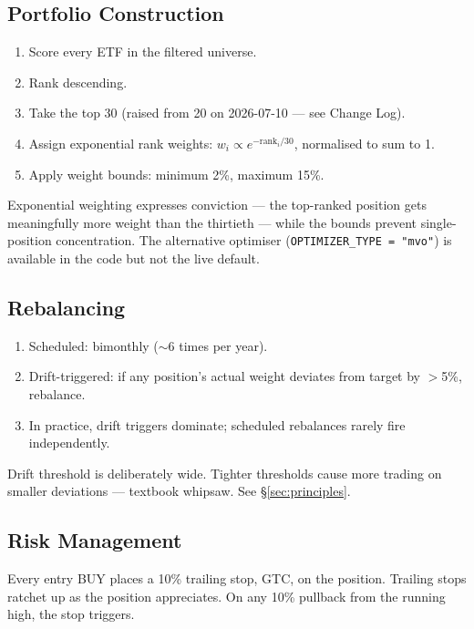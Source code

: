 \documentclass[11pt,a4paper]{article}
\begin{document}
\subsection{Portfolio Construction}

\begin{enumerate}[noitemsep]
    \item Score every ETF in the filtered universe.
    \item Rank descending.
    \item Take the top 30 (raised from 20 on 2026-07-10 --- see Change Log).
    \item Assign exponential rank weights: $w_i \propto e^{-\text{rank}_i / 30}$, normalised to sum to 1.
    \item Apply weight bounds: minimum 2\%, maximum 15\%.
\end{enumerate}

Exponential weighting expresses conviction --- the top-ranked position gets meaningfully more weight than the thirtieth --- while the bounds prevent single-position concentration. The alternative optimiser (\texttt{OPTIMIZER\_TYPE = "mvo"}) is available in the code but not the live default.

\subsection{Rebalancing}

\begin{enumerate}[noitemsep]
    \item Scheduled: bimonthly ($\sim$6 times per year).
    \item Drift-triggered: if any position's actual weight deviates from target by $>$5\%, rebalance.
    \item In practice, drift triggers dominate; scheduled rebalances rarely fire independently.
\end{enumerate}

Drift threshold is deliberately wide. Tighter thresholds cause more trading on smaller deviations --- textbook whipsaw. See \S\ref{sec:principles}.

\subsection{Risk Management}

Every entry BUY places a 10\% trailing stop, GTC, on the position. Trailing stops ratchet up as the position appreciates. On any 10\% pullback from the running high, the stop triggers.
\end{document}
